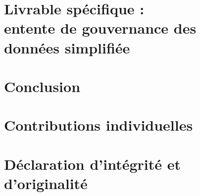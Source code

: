 \documentclass[12pt,letterpaper]{article}
\begin{document}
\section[Livrable spécifique : entente de gouvernance des données simplifiée]{Livrable spécifique :\\ entente de gouvernance des données simplifiée}
\label{sec:entente}


\section{Conclusion}
\label{sec:conclusion}

\clearpage
\nocite{eptc2,loi25,pcap,mcmahan2017fedavg}
\begin{singlespace}
\renewcommand{\refname}{Références}


\end{singlespace}

\clearpage
\begin{appendices}

\section{Contributions individuelles}
\label{ann:contributions}


\clearpage
\section{Déclaration d'intégrité et d'originalité}
\label{ann:integrite}


\end{appendices}
\end{document}
